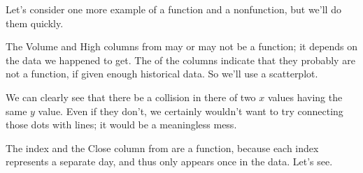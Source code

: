 \documentclass[letterpaper,10pt,english]{sphinxmanual}
\begin{document}
Let’s consider one more example of a function and a non\sphinxhyphen{}function, but we’ll do them quickly.

 The Volume and High columns from  may or may not be a function; it depends on the data we happened to get.  The  of the columns indicate that they probably are not a function, if given enough historical data.  So we’ll use a scatterplot.

\begin{sphinxVerbatim}[commandchars=\\\{\}]
 \PYG{p}{[}\PYG{p}{]} \PYG{p}{[}\PYG{p}{]}   
      
  
  
\end{sphinxVerbatim}

\noindent{}

We can clearly see that there  be a collision in there of two \(x\) values having the same \(y\) value.  Even if they don’t, we certainly wouldn’t want to try connecting those dots with lines; it would be a meaningless mess.

 The index and the Close column from  are a function, because each index represents a separate day, and thus only appears once in the data.  Let’s see.
\end{document}
